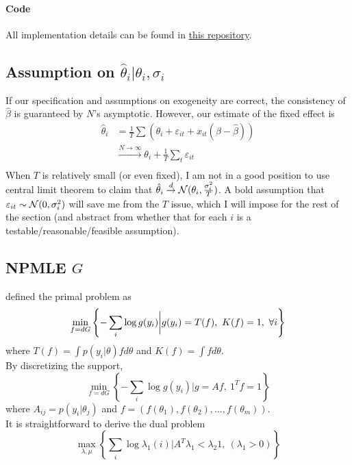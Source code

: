 \documentclass[12pt]{article}
\begin{document}
\paragraph{Code} All implementation details can be found in
\href{https://github.com/zfuak/RankHospital}{this repository}.

\subsection{Assumption on $\hat{\theta}_i|\theta_i,\sigma_i$}
If our specification and assumptions on exogeneity are correct, the consistency
of $\hat{\beta}$ is guaranteed by $N$'s asymptotic. However, our estimate of
the fixed effect is
\begin{align*}
    \hat{\theta}_i & =\frac{1}{T}\sum(\theta_i+\varepsilon_{it}+x_{it}(\beta-\hat{\beta}))              \\
                   & \overset{N\to \infty}{\longrightarrow} \theta_i+\frac{1}{T}\sum_t \varepsilon_{it} \\
\end{align*}
When $T$ is relatively small (or even fixed), I am not in a good position to use central limit theorem to claim that $\hat{\theta}_i \overset{d}{\to} \mathcal{N}(\theta_i,\frac{\sigma_i^2}{T})$. A bold assumption that $\varepsilon_{it} \sim \mathcal{N}(0,\sigma_i^2)$ will save me from the $T$ issue, which I will impose for the rest of the section (and abstract from whether that  for each $i$ is a testable/reasonable/feasible assumption).

\subsection{NPMLE $G$}
\citet{koenker2014convex} defined the primal problem as
\begin{equation*}
    \min_{f=dG}\left\{-\sum_i \log g(y_i)\bigg |g(y_i) = T(f),\ K(f)=1,\ \forall i \right\}
\end{equation*}
where $ T(f)=\int p(y_i |\theta)fd\theta $ and  $K(f)= \int f d\theta$.\\
By discretizing the support,
\begin{equation*}
    \min_{f=dG}\left\{-\sum_i \log g(y_i)\bigg |g=Af,\ {1^T}f=1\right\}
\end{equation*}
where $A_{ij}= p(y_i|\theta_j) $ and $ f = (f(\theta_1),f(\theta_2),\ldots,f(\theta_m))$.\\
It is straightforward to derive the dual problem
\begin{equation*}
    \max_{\lambda,\mu} \left\{ \sum_i \log \lambda_1(i) \bigg| A^T\lambda_1 < \lambda_2 1,\ (\lambda_1>0) \right\}
\end{equation*}
\end{document}
